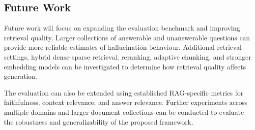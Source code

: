 \documentclass[conference]{IEEEtran}
\begin{document}
\subsection{Future Work}
Future work will focus on expanding the evaluation benchmark and improving retrieval quality. Larger collections of answerable and unanswerable questions can provide more reliable estimates of hallucination behaviour. Additional retrieval settings, hybrid dense-sparse retrieval, reranking, adaptive chunking, and stronger embedding models can be investigated to determine how retrieval quality affects generation.

The evaluation can also be extended using established RAG-specific metrics for faithfulness, context relevance, and answer relevance. Further experiments across multiple domains and larger document collections can be conducted to evaluate the robustness and generalizability of the proposed framework.
\end{document}
